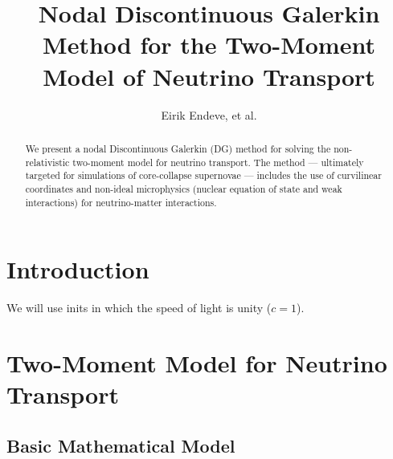\documentclass[10pt,preprint]{aastex}
\begin{document}
\title{Nodal Discontinuous Galerkin Method for the Two-Moment Model of Neutrino Transport}
\author{Eirik Endeve, et al.}

\begin{abstract}
We present a nodal Discontinuous Galerkin (DG) method for solving the non-relativistic two-moment model for neutrino transport.  
The method --- ultimately targeted for simulations of core-collapse supernovae --- includes the use of curvilinear coordinates and non-ideal microphysics (nuclear equation of state and weak interactions) for neutrino-matter interactions.  
\end{abstract}

\tableofcontents

\section{Introduction}

We will use inits in which the speed of light is unity ($c=1$).  

\section{Two-Moment Model for Neutrino Transport}
\label{sec:twoMomentModel}

\subsection{Basic Mathematical Model}
\end{document}
